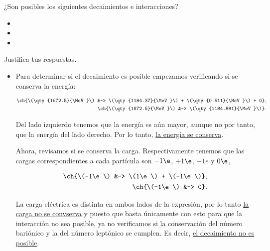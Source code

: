 \documentclass[./../main.tex]{subfiles}
\begin{document}
    \begin{exercise}
        ¿Son posibles los siguientes decaimientos e interacciones?

        \begin{itemize}
            \item \ch{\Omega- -> \Sigma+ + \e- + {$\overline{\nu}$}_{\e}}
            \item {}
            \item {}
        \end{itemize}

        Justifica tus respuestas.

        \begin{solution}
            \begin{itemize}
                \item \ch{\Omega- -> \Sigma+ + \e- + {$\overline{\nu}$}_{\e}}
                
                Para determinar si el decaimiento es posible empezamos verificando si se conserva la energía:

                \begin{align*}
                    \ch{\(\qty{1672.5}{\MeV}\) &-> \(\qty{1184.37}{\MeV}\) + \(\qty{0.511}{\MeV}\) + 0},\\
                    \ch{\(\qty{1672.5}{\MeV}\) &-> \(\qty{1184.881}{\MeV}\)}.
                \end{align*}

                Del lado izquierdo tenemos que la energía es aún mayor, aunque no por tanto, que la energía del lado derecho. Por lo tanto, \ul{la energía se conserva}.

                Ahora, revisamos si se conserva la carga. Respectivamente tenemos que las cargas correspondientes a cada partícula son \(-1\e\), \(+1\e\), \(-1e\) y \(0\e\), \idest

                \begin{align*}
                    \ch{\(-1\e\) &-> \(1\e\) + \(-1\e\)},\\
                    \ch{\(-1\e\) &-> 0}.
                \end{align*}

                La carga eléctrica es distinta en ambos lados de la expresión, por lo tanto \ul{la carga no se convserva} y puesto que basta únicamente con esto para que la interacción no sea posible, ya no verificamos si la conservación del número bariónico y la del número leptónico se cumplen. Es decir, \ul{el decaimiento no es posible}.
                

\end{itemize}
\end{solution}
\end{exercise}
\end{document}
